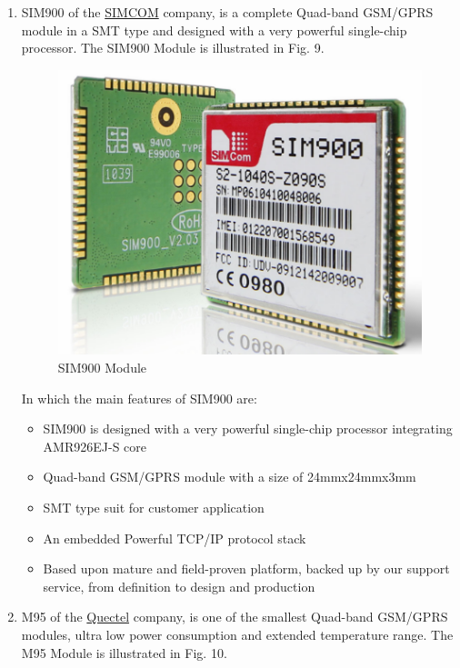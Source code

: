 \documentclass[10pt,journal,compsoc]{IEEEtran}
\begin{document}
\begin{enumerate}[\IEEEsetlabelwidth{2)}]

\item SIM900 of the \href{http://www.simcom.eu}{SIMCOM} company, is a complete Quad-band GSM/GPRS module in a SMT type and designed with a very powerful single-chip processor. The SIM900 Module is illustrated in Fig. 9.

\begin{figure}[h]
  \centering
  \captionsetup{justification=centering}
  \includegraphics[scale=.45]{es8}
  \caption{SIM900 Module}
  \label{fig:fig9}
\end{figure}

\hfil

In which the main features of SIM900 are:

\begin{itemize}
  \item SIM900 is designed with a very powerful single-chip processor integrating AMR926EJ-S core 
  \item Quad-band GSM/GPRS module with a size of 24mmx24mmx3mm 
  \item SMT type suit for customer application
  \item An embedded Powerful TCP/IP protocol stack 
  \item Based upon mature and field-proven platform, backed up by our support service, from definition to design and production 
\end{itemize}

\hfil

\item M95 of the \href{http://www.quectel.com/default.aspx}{Quectel} company, is one of the smallest Quad-band GSM/GPRS modules, ultra low power consumption and extended temperature range. The M95 Module is illustrated in Fig. 10.


\end{enumerate}
\end{document}
